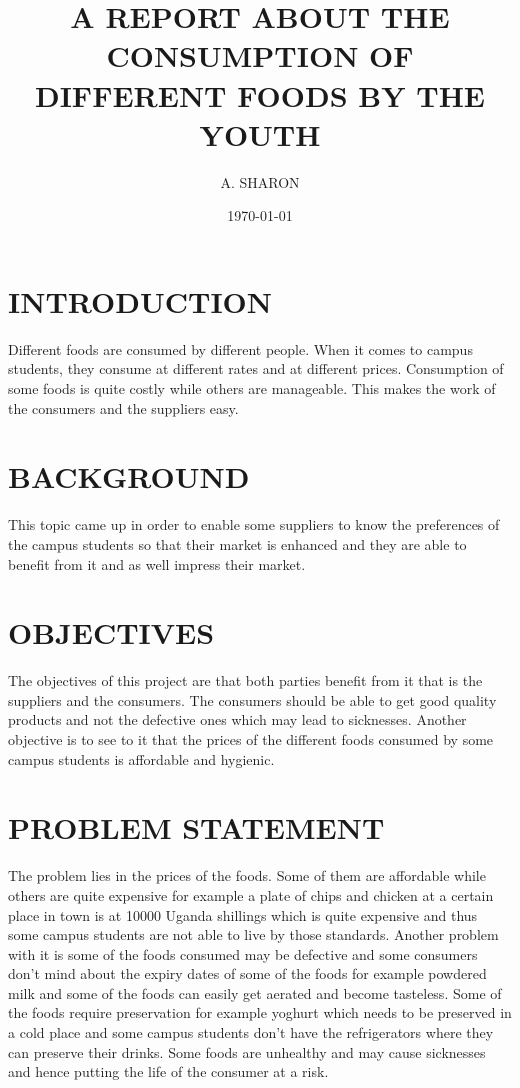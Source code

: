 \documentclass[14pt]{article}
\begin{document}
\title{A REPORT ABOUT THE CONSUMPTION OF DIFFERENT FOODS BY THE YOUTH}
\author{A. SHARON}

\date {\today}

\maketitle

\tableofcontents

\section{INTRODUCTION}

Different foods are consumed by different people. When it comes to campus students, they consume at different rates and at different prices. Consumption of some foods is quite costly while others are manageable. This makes the work of the consumers and the suppliers easy.

\section{BACKGROUND}

This topic came up in order to enable some suppliers to know the preferences of the campus students so that their market is enhanced and they are able to benefit from it and as well impress their market. 

\section{OBJECTIVES}

The objectives of this project are that both parties benefit from it that is the suppliers and the consumers. The consumers should be able to get good quality products and not the defective ones which may lead to sicknesses.
Another objective is to see to it that the prices of the different foods consumed by some campus students is affordable and hygienic.

\section{PROBLEM STATEMENT}

The problem lies in the prices of the foods. Some of them are affordable while others are quite expensive for example a plate of chips and chicken at a certain place in town is at 10000 Uganda shillings which is quite expensive and thus some campus students are not able to live by those standards. Another problem with it is some of the foods consumed may be defective and some consumers don’t mind about the expiry dates of some of the foods for example powdered milk and some of the foods can easily get aerated and become tasteless.
Some of the foods require preservation for example yoghurt which needs to be preserved in a cold place and some campus students don’t have the refrigerators where they can preserve their drinks. Some foods are unhealthy and may cause sicknesses and hence putting the life of the consumer at a risk.
\end{document}
